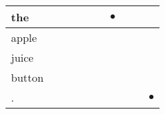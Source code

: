 \documentclass[landscape]{article}
\newcommand{\ssp}{\hspace{2pt}}
\newcommand{\mex}{\cellcolor{g}$\bullet$}
\begin{document}
\begin{tabular}{|l|p{10pt}|p{10pt}|p{10pt}|p{10pt}|p{10pt}|p{10pt}|p{10pt}|p{10pt}|p{10pt}|}
\hline
\ssp \cellcolor{ref5}the \ssp&\hspace{2pt}&\hspace{2pt}&\hspace{2pt}&\hspace{2pt}&\hspace{2pt}&\hspace{2pt}\mex&\hspace{2pt}&\hspace{2pt}&\hspace{2pt}\\
\hline
\ssp apple \ssp&\hspace{2pt}&\hspace{2pt}&\hspace{2pt}&\hspace{2pt}&\hspace{2pt}&\hspace{2pt}&\hspace{2pt}&\hspace{2pt}&\hspace{2pt}\\
\hline
\ssp juice \ssp&\hspace{2pt}&\hspace{2pt}&\hspace{2pt}&\hspace{2pt}&\hspace{2pt}&\hspace{2pt}&\hspace{2pt}&\hspace{2pt}&\hspace{2pt}\\
\hline
\ssp button \ssp&\hspace{2pt}&\hspace{2pt}&\hspace{2pt}&\hspace{2pt}&\hspace{2pt}&\hspace{2pt}&\hspace{2pt}&\hspace{2pt}&\hspace{2pt}\\
\hline
\ssp \cellcolor{ref8}. \ssp&\hspace{2pt}&\hspace{2pt}&\hspace{2pt}&\hspace{2pt}&\hspace{2pt}&\hspace{2pt}&\hspace{2pt}&\hspace{2pt}&\hspace{2pt}\mex\\
\hline
\end{tabular}
\end{document}

